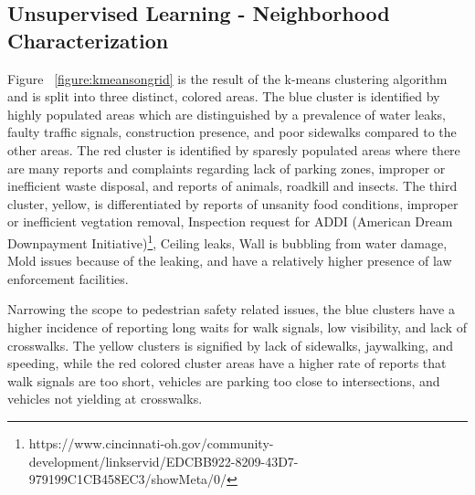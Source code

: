 \documentclass{llncs}
\begin{document}
\subsection{Unsupervised Learning - Neighborhood Characterization}

Figure ~\ref{figure:kmeansongrid} is the result of the k-means clustering algorithm and is split into three distinct, colored areas. The blue cluster is identified by highly populated areas which are distinguished by a prevalence of water leaks, faulty traffic signals, construction presence, and poor sidewalks compared to the other areas. The red cluster is identified by sparesly populated areas where there are many reports and complaints regarding lack of parking zones, improper or inefficient waste disposal, and reports of animals, roadkill and insects. The third cluster, yellow, is differentiated by reports of unsanity food conditions, improper or inefficient vegtation removal, Inspection request for ADDI (American Dream Downpayment Initiative)\footnote{https://www.cincinnati-oh.gov/community-development/linkservid/EDCBB922-8209-43D7-979199C1CB458EC3/showMeta/0/}, Ceiling leaks, Wall is bubbling from water damage, Mold issues because of the leaking, and have a relatively higher presence of law enforcement facilities.

Narrowing the scope to pedestrian safety related issues, the blue clusters have a higher incidence of reporting long waits for walk signals, low visibility, and lack of crosswalks. The yellow clusters is signified by lack of sidewalks, jaywalking, and speeding, while the red colored cluster areas have a higher rate of reports that walk signals are too short, vehicles are parking too close to intersections, and vehicles not yielding at crosswalks. 
\end{document}
